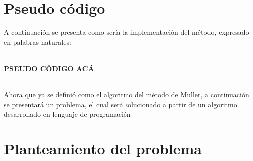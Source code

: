 \documentclass[ceqn,10pt]{SelfArx}
\begin{document}
\section{Pseudo código}
A continuación se presenta como sería la implementación del método, expresado en palabras naturales:\\\


\textbf{PSEUDO CÓDIGO ACÁ}\\\

Ahora que ya se definió como el algoritmo del método de Muller, a continuación se presentará un problema, el cual será solucionado a partir de un algoritmo desarrollado en lenguaje de programación 
\section{Planteamiento del problema}






\end{document}
